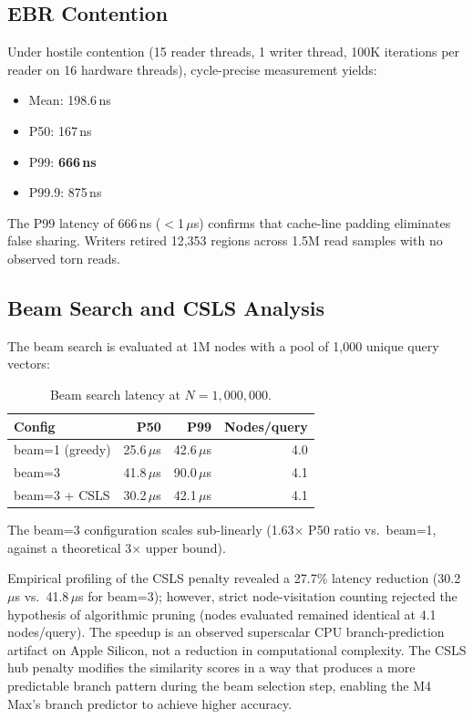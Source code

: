 \documentclass[10pt,twocolumn]{article}
\begin{document}
\subsection{EBR Contention}

Under hostile contention (15 reader threads, 1 writer thread, 100K iterations per reader on 16 hardware threads), cycle-precise measurement yields:

\begin{itemize}
    \item Mean: 198.6\,ns
    \item P50: 167\,ns
    \item P99: \textbf{666\,ns}
    \item P99.9: 875\,ns
\end{itemize}

The P99 latency of 666\,ns ($<$1\,$\mu$s) confirms that cache-line padding eliminates false sharing. Writers retired 12,353 regions across 1.5M read samples with no observed torn reads.

\subsection{Beam Search and CSLS Analysis}

The beam search is evaluated at 1M nodes with a pool of 1,000 unique query vectors:

\begin{table}[!htbp]
\centering
\caption{Beam search latency at $N = 1{,}000{,}000$.}
\label{tab:beam}
\begin{tabular}{lrrr}
\toprule
\textbf{Config} & \textbf{P50} & \textbf{P99} & \textbf{Nodes/query} \\
\midrule
beam=1 (greedy) & 25.6\,$\mu$s & 42.6\,$\mu$s & 4.0 \\
beam=3 & 41.8\,$\mu$s & 90.0\,$\mu$s & 4.1 \\
beam=3 + CSLS & 30.2\,$\mu$s & 42.1\,$\mu$s & 4.1 \\
\bottomrule
\end{tabular}
\end{table}

The beam=3 configuration scales sub-linearly (1.63$\times$ P50 ratio vs.\ beam=1, against a theoretical 3$\times$ upper bound).

Empirical profiling of the CSLS penalty revealed a 27.7\% latency reduction (30.2\,$\mu$s vs.\ 41.8\,$\mu$s for beam=3); however, strict node-visitation counting rejected the hypothesis of algorithmic pruning (nodes evaluated remained identical at 4.1 nodes/query). The speedup is an observed superscalar CPU branch-prediction artifact on Apple Silicon, not a reduction in computational complexity. The CSLS hub penalty modifies the similarity scores in a way that produces a more predictable branch pattern during the beam selection step, enabling the M4 Max's branch predictor to achieve higher accuracy.
\end{document}
